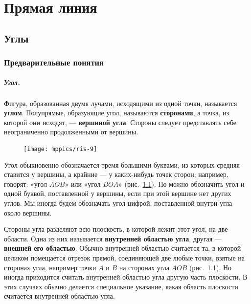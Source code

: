 \documentclass[oneside]{book}
\begin{document}

\chapter{Прямая линия}


\section{Углы} 

\subsection*{Предварительные понятия}

\paragraph{Угол.}\label{1938/13}
Фигура, образованная двумя лучами, исходящими из одной точки, называется \textbf{углом}.
Полупрямые, образующие угол, называются \textbf{сторонами}, а точка, из которой они исходят, — \textbf{вершиной угла}.
Стороны следует представлять себе неограниченно продолженными от вершины.

\begin{figure}
\centering
\texttt{[image: mppics/ris-9]}
\caption{}\label{1938/ris-9}
\end{figure}

Угол обыкновенно обозначается тремя большими буквами, из которых средняя ставится у вершины, а крайние — у каких-нибудь точек сторон;
например, говорят:
«угол $AOB$» или «угол $BOA$» (рис.~\ref{1938/ris-9}).
Но можно обозначить угол и одной буквой, поставленной у вершины, если при этой вершине нет других углов.
Мы иногда будем обозначать угол цифрой, поставленной внутри угла около вершины.

Стороны угла разделяют всю плоскость, в которой лежит этот угол, на две области.
Одна из них называется \textbf{внутренней областью угла}, другая — \textbf{внешней его областью}.
Обычно внутренней областью считается та, в которой целиком помещается отрезок прямой, соединяющей две любые точки, взятые на сторонах угла, например точки $A$ и $B$ на сторонах угла $AOB$ (рис.~\ref{1938/ris-9}).
Но иногда приходится считать внутренней областью угла другую часть плоскости.
В этих случаях обычно делается специальное указание, какая область плоскости считается внутренней областью угла.
\end{document}
